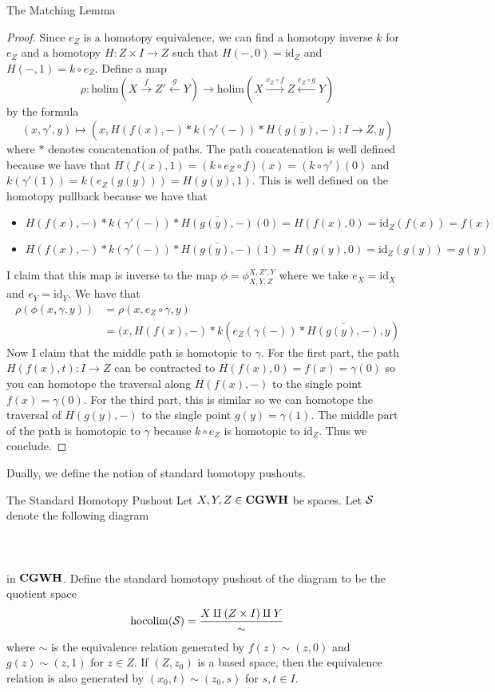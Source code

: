 \documentclass[a4paper]{article}
\begin{document}
\begin{thm}{The Matching Lemma}{}
\begin{proof}
Since $e_Z$ is a homotopy equivalence, we can find a homotopy inverse $k$ for $e_Z$ and a homotopy $H:Z\times I\to Z$ such that $H(-,0)=\text{id}_Z$ and $H(-,1)=k\circ e_Z$. Define a map $$\rho:\text{holim}(X\overset{f}{\rightarrow}Z'\overset{g}{\leftarrow}Y)\to\text{holim}(X\overset{e_Z\circ f}{\rightarrow}Z\overset{e_Z\circ g}{\leftarrow}Y)$$ by the formula $$(x,\gamma',y)\mapsto(x,H(f(x),-)\ast k(\gamma'(-))\ast\overline{H(g(y),-)}:I\to Z,y)$$ where $\ast$ denotes concatenation of paths. The path concatenation is well defined because we have that $H(f(x),1)=(k\circ e_Z\circ f)(x)=(k\circ\gamma')(0)$ and $k(\gamma'(1))=k(e_Z(g(y)))=H(g(y),1)$. This is well defined on the homotopy pullback because we have that 
\begin{itemize}
\item $H(f(x),-)\ast k(\gamma'(-))\ast\overline{H(g(y),-)}(0)=H(f(x),0)=\text{id}_Z(f(x))=f(x)$
\item $H(f(x),-)\ast k(\gamma'(-))\ast\overline{H(g(y),-)}(1)=H(g(y),0)=\text{id}_Z(g(y))=g(y)$
\end{itemize}
I claim that this map is inverse to the map $\phi=\phi_{X,Y,Z}^{X,Z',Y}$ where we take $e_X=\text{id}_X$ and $e_Y=\text{id}_Y$. We have that 
\begin{align*}
\rho(\phi(x,\gamma,y))&=\rho(x,e_Z\circ\gamma,y)\\
&=(x,H(f(x),-)\ast k(e_Z(\gamma(-))\ast\overline{H(g(y),-)},y)
\end{align*}
Now I claim that the middle path is homotopic to $\gamma$. For the first part, the path $H(f(x),t):I\to Z$ can be contracted to $H(f(x),0)=f(x)=\gamma(0)$ so you can homotope the traversal along $H(f(x),-)$ to the single point $f(x)=\gamma(0)$. For the third part, this is similar so we can homotope the traversal of $\overline{H(g(y),-)}$ to the single point $g(y)=\gamma(1)$. The middle part of the path is homotopic to $\gamma$ because $k\circ e_Z$ is homotopic to $\text{id}_Z$. Thus we conclude. 
\end{proof}
\end{thm}

Dually, we define the notion of standard homotopy pushouts. 

\begin{defn}{The Standard Homotopy Pushout}{} Let $X,Y,Z\in\bold{CGWH}$ be spaces. Let $\mathcal{S}$ denote the following diagram \\~\\
\\~\\
in $\bold{CGWH}$. Define the standard homotopy pushout of the diagram to be the quotient space $$\operatorname*{hocolim}(\mathcal{S})=\frac{X\amalg(Z\times I)\amalg Y}{\sim}$$ where $\sim$ is the equivalence relation generated by $f(z)\sim (z,0)$ and $g(z)\sim(z,1)$ for $z\in Z$. If $(Z,z_0)$ is a based space, then the equivalence relation is also generated by $(x_0,t)\sim(z_0,s)$ for $s,t\in I$. 
\end{defn}
\end{document}
